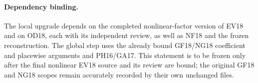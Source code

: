 \paragraph{Dependency binding.}
The local upgrade depends on the completed
nonlinear-factor version of EV18 and on OD18,
each with its independent review, as well as
NF18 and the frozen reconstruction.  The
global step uses the already bound GF18/NG18
coefficient and placewise arguments and
PH16/GA17.  This statement is to be frozen
only after the final nonlinear EV18 source
and its review are bound; the original GF18
and NG18 scopes remain accurately recorded
by their own unchanged files.

